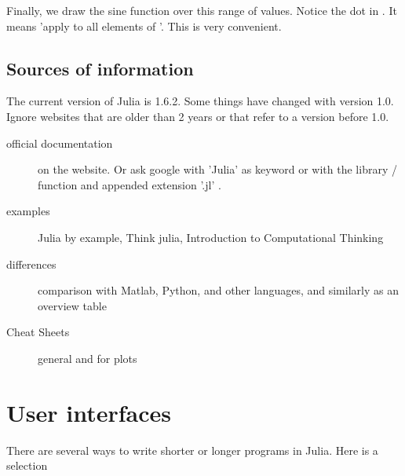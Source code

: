 Finally, we draw the sine function over this range of values. Notice the dot in . It means 'apply  to all elements of '. This is very convenient.


\subsection{Sources of information}

The current version of Julia is 1.6.2. Some things have changed with version 1.0. Ignore websites that are older than 2 years or that refer to a version before 1.0.

\begin{description}

\item[official documentation] on the website. Or ask google with 'Julia' as keyword or with the library / function and appended extension '.jl' .

\item[examples] Julia by example, Think julia, Introduction to Computational Thinking

\item[differences] comparison with Matlab, Python, and other languages, and similarly as an overview table

\item[Cheat Sheets] general and for plots 

\end{description}


\section{User interfaces}


There are several ways to write shorter or longer programs in Julia. Here is a selection

